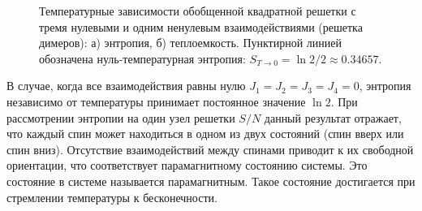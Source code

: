 \documentclass[utf8,12pt]{jetp}
\begin{document}
\begin{figure}[h]
	\begin{minipage}[h]{0.5\linewidth}
	\end{minipage}
	\hfill
	\begin{minipage}[h]{0.5\linewidth}
	\end{minipage}
	\caption{Температурные зависимости обобщенной квадратной решетки с тремя нулевыми и одним ненулевым взаимодействиями (решетка димеров): а) энтропия, б) теплоемкость. Пунктирной линией обозначена нуль-температурная энтропия: $S_{T\rightarrow 0} = \ln 2/2\approx 0.34657$.}
	\label{Dimers}
\end{figure}

В случае, когда все взаимодействия равны нулю $J_1 = J_2 = J_3 = J_4 = 0$, энтропия независимо от температуры принимает постоянное значение $\ln 2$. При рассмотрении энтропии на один узел решетки $S/N$ данный результат отражает, что каждый спин может находиться в одном из двух состояний (спин вверх или спин вниз). Отсутствие взаимодействий между спинами приводит к их свободной ориентации, что соответствует парамагнитному состоянию системы. Это состояние в системе называется парамагнитным. Такое состояние достигается при стремлении температуры к бесконечности.
\end{document}
